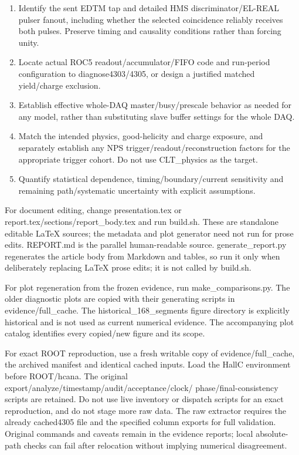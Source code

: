\begin{enumerate}
\item Identify the sent EDTM tap and detailed HMS discriminator/EL-REAL pulser fanout, including whether the selected coincidence reliably receives both pulses. Preserve timing and causality conditions rather than forcing unity.
\item Locate actual ROC5 readout/accumulator/FIFO code and run-period configuration to diagnose4303/4305, or design a justified matched yield/charge exclusion.
\item Establish effective whole-DAQ master/busy/prescale behavior as needed for any model, rather than substituting slave buffer settings for the whole DAQ.
\item Match the intended physics, good-helicity and charge exposure, and separately establish any NPS trigger/readout/reconstruction factors for the appropriate trigger cohort. Do not use CLT\_physics as the target.
\item Quantify statistical dependence, timing/boundary/current sensitivity and remaining path/systematic uncertainty with explicit assumptions.
\end{enumerate}
For document editing, change presentation.tex or report.tex/sections/report\_body.tex and run build.sh. These are standalone editable LaTeX sources; the metadata and plot generator need not run for prose edits. REPORT.md is the parallel human-readable source. generate\_report.py regenerates the article body from Markdown and tables, so run it only when deliberately replacing LaTeX prose edits; it is not called by build.sh.


For plot regeneration from the frozen evidence, run make\_comparisons.py. The older diagnostic plots are copied with their generating scripts in evidence/full\_cache. The historical\_168\_segments figure directory is explicitly historical and is not used as current numerical evidence. The accompanying plot catalog identifies every copied/new figure and its scope.


For exact ROOT reproduction, use a fresh writable copy of evidence/full\_cache, the archived manifest and identical cached inputs. Load the HallC environment before ROOT/hcana. The original export/analyze/timestamp/audit/acceptance/clock/ phase/final-consistency scripts are retained. Do not use live inventory or dispatch scripts for an exact reproduction, and do not stage more raw data. The raw extractor requires the already cached4305 file and the specified column exports for full validation. Original commands and caveats remain in the evidence reports; local absolute-path checks can fail after relocation without implying numerical disagreement.



